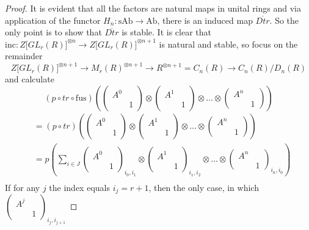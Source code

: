 {\begin{proof}
It is evident that all the factors are natural maps in unital rings and via application of the functor $H_n\colon \mathrm{sAb} \rightarrow \mathrm{Ab}$,
there is an induced map $\overline{Dtr}$. So the only point is to show that $\overline{Dtr}$ is stable. It is clear that
$\mathrm{inc} \colon Z\lbrack GL_r(R) \rbrack^{\otimes n} \rightarrow Z\lbrack GL_r(R)\rbrack^{\otimes n+1}$
is natural and stable, so focus on the remainder
$$Z\lbrack GL_r(R) \rbrack^{\otimes n+1} \rightarrow M_r(R)^{\otimes n+1} \rightarrow R^{\otimes n+1} = C_n(R) \rightarrow C_n(R)/D_n(R)$$
and calculate
$$(p\circ tr \circ \mathrm{fus} )\left( \begin{pmatrix} A^0 & \\ & 1\end{pmatrix} \otimes \begin{pmatrix} A^1 & \\
 & 1\end{pmatrix} \otimes \ldots \otimes \begin{pmatrix} A^n & \\ & 1\end{pmatrix} \right)$$
$$\begin{aligned}&= (p \circ tr) \left( \begin{pmatrix} A^0 & \\
& 1\end{pmatrix} \otimes \begin{pmatrix} A^1 & \\ & 1\end{pmatrix} \otimes \ldots \otimes \begin{pmatrix} A^n & \\ & 1\end{pmatrix} \right)\\
&=p\left(\sum\limits_{i\in J}\begin{pmatrix} A^0 & \\ & 1\end{pmatrix}_{i_0,i_1} \otimes \begin{pmatrix} A^1 & \\
& 1\end{pmatrix}_{i_1,i_2} \otimes \ldots \otimes \begin{pmatrix} A^n & \\ & 1\end{pmatrix}_{i_n,i_0}\right)\\\end{aligned}$$
If for any $j$ the index equals $i_j = r+1$, then the only case, in which $\begin{pmatrix} A^j & \\ & 1\end{pmatrix}_{i_j,i_{j+1}}$

\end{proof}}
